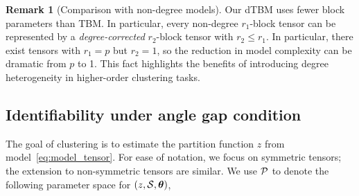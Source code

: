 \documentclass[journal]{IEEEtran}
\theoremstyle{definition}
\theoremstyle{definition}
\newtheorem{rmk}{Remark}
\begin{document}
\begin{rmk}[Comparison with non-degree models]
Our dTBM uses fewer block parameters than TBM. In particular, every non-degree $r_1$-block tensor can be represented by a \emph{degree-corrected} $r_2$-block tensor with $r_2\leq r_1$. In particular, there exist tensors with $r_1=p$ but $r_2=1$, so the reduction in model complexity can be dramatic from $p$ to 1. This fact highlights the benefits of introducing degree heterogeneity in higher-order clustering tasks.
\end{rmk}


\subsection{Identifiability under angle gap condition}\label{subsec:identify}
The goal of clustering is to estimate the partition function $z$ from model~\eqref{eq:model_tensor}. For ease of notation, we focus on symmetric tensors; the extension to non-symmetric tensors are similar. We use $\mathcal{P}$ to denote the following parameter space for $(z,\mathcal{S},\boldsymbol{\theta})$,
\end{document}
